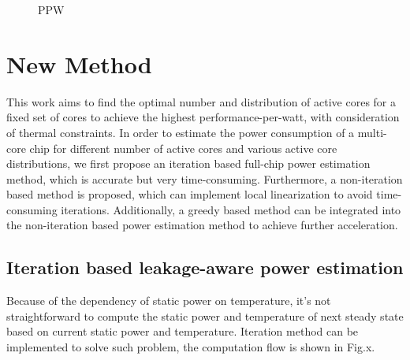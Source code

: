 \begin{figure}[htb]
\centering
{}
\caption{PPW}  
\label{fig:ppw}
\end{figure}

\section{New Method}
This work aims to find the optimal number and distribution of active cores for a fixed set of cores to achieve the highest performance-per-watt, with consideration of thermal constraints. In order to estimate the power consumption of a multi-core chip for different number of active cores and various active core distributions, we first propose an iteration based full-chip power estimation method, which is accurate but very time-consuming. Furthermore, a non-iteration based method is proposed, which can implement local linearization to avoid time-consuming iterations. Additionally, a greedy based method can be integrated into the non-iteration based power estimation method to achieve further acceleration.

\subsection{Iteration based leakage-aware power estimation}
Because of the dependency of static power on temperature, it's not straightforward to compute the static power and temperature of next steady state based on current static power and temperature. Iteration method can be implemented to solve such problem, the computation flow is shown in Fig.x.

